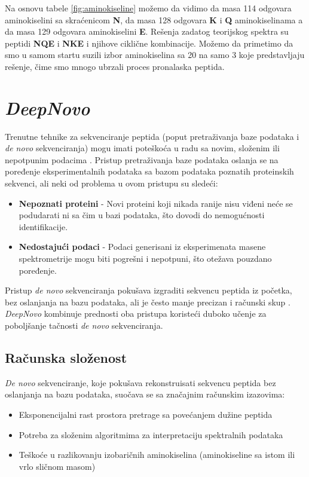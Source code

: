 \documentclass[12pt,oneside]{memoir}
\begin{document}
Na osnovu tabele \ref{fig:aminokiseline} možemo da vidimo da masa 114 odgovara aminokiselini sa skraćenicom \textbf{N}, da masa 128 odgovara \textbf{K} i \textbf{Q} aminokiselinama a da masa 129 odgovara aminokiselini \textbf{E}.
Rešenja zadatog teorijskog spektra su peptidi \textbf{NQE} i \textbf{NKE} i njihove ciklične kombinacije. Možemo da primetimo da smo u samom startu suzili izbor aminokiselina sa 20 na samo 3 koje predstavljaju rešenje, čime smo mnogo ubrzali proces pronalaska peptida.

\section{\emph{DeepNovo}}

Trenutne tehnike za sekvenciranje peptida (poput pretraživanja baze podataka i \emph{de novo} sekvenciranja) mogu imati poteškoća u radu sa novim, složenim ili nepotpunim podacima \cite{deepnovo}. Pristup pretraživanja baze podataka oslanja se na poređenje eksperimentalnih podataka sa bazom podataka poznatih proteinskih sekvenci, ali neki od problema u ovom pristupu su sledeći:

\begin{itemize}
    \item \textbf{Nepoznati proteini} - Novi proteini koji nikada ranije nisu viđeni neće se podudarati ni sa čim u bazi podataka, što dovodi do nemogućnosti identifikacije.
    \item \textbf{Nedostajući podaci} - Podaci generisani iz eksperimenata masene spektrometrije mogu biti pogrešni i nepotpuni, što otežava pouzdano poređenje.
\end{itemize}

Pristup \emph{de novo} sekvenciranja pokušava izgraditi sekvencu peptida iz početka, bez oslanjanja na bazu podataka, ali je često manje precizan i računski skup \cite{deepnovo}. \emph{DeepNovo} kombinuje prednosti oba pristupa koristeći duboko učenje za poboljšanje tačnosti \emph{de novo} sekvenciranja.

\subsection{Računska složenost}
\emph{De novo} sekvenciranje, koje pokušava rekonstruisati sekvencu peptida bez oslanjanja na bazu podataka, suočava se sa značajnim računskim izazovima:

\begin{itemize}
\item Eksponencijalni rast prostora pretrage sa povećanjem dužine peptida
\item Potreba za složenim algoritmima za interpretaciju spektralnih podataka
\item Teškoće u razlikovanju izobaričnih aminokiselina (aminokiseline sa istom ili vrlo sličnom masom)
\end{itemize}
\end{document}
